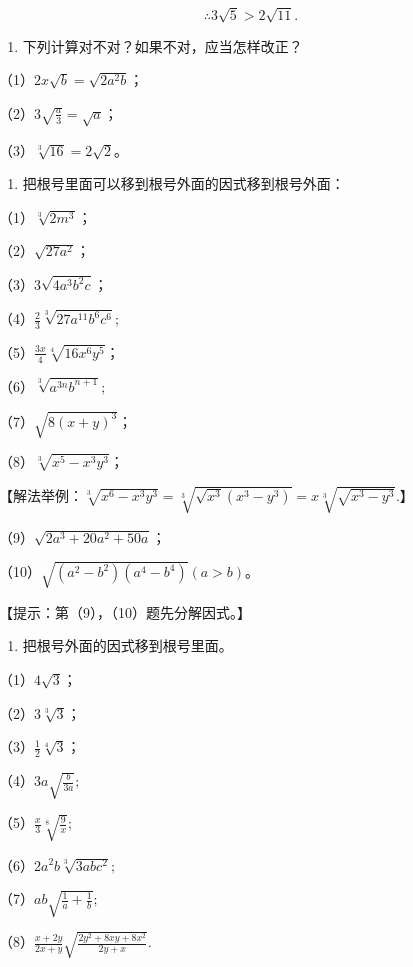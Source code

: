 \[
\therefore 3 \sqrt {5} > 2 \sqrt {11}.
\]

\begin{enumerate}
\item
  下列计算对不对？如果不对，应当怎样改正？
\end{enumerate}

（1）\(2x\sqrt{b} = \sqrt{2a^2b}\)；

（2）\(3\sqrt{\frac{a}{3}} = \sqrt{a}\)；

（3）\(\sqrt[3]{16} = 2\sqrt{2}\)。

\begin{enumerate}[start=2]
\item
  把根号里面可以移到根号外面的因式移到根号外面：
\end{enumerate}

（1）\(\sqrt[3]{2m^3}\)；

（2）\(\sqrt{27a^2}\)；

（3）\(3\sqrt{4a^3b^2c}\)；

（4）\(\frac{2}{3}\sqrt[3]{27a^{11}b^{6}c^{6}};\)

（5）\(\frac{3x}{4}\sqrt[4]{16x^6y^5}\)；

（6）\(\sqrt[3]{a^{3n}b^{n+1}};\)

（7）\(\sqrt{8(x + y)^3}\)；

（8）\(\sqrt[3]{x^5 - x^3y^3}\)；

【解法举例：\(\sqrt[3]{x^6 - x^3y^3} = \sqrt[3]{\sqrt{x^3}(x^3 - y^3)} = x\sqrt[3]{\sqrt{x^3 - y^3}}.\)】

（9）\(\sqrt{2a^3 + 20a^2 + 50a}\)；

（10）\(\sqrt{(a^2 - b^2)(a^4 - b^4)} (a > b)\)。

【提示：第（9），（10）题先分解因式。】

\begin{enumerate}[start=3]
\item
  把根号外面的因式移到根号里面。
\end{enumerate}

（1）\(4\sqrt{3}\)；

（2）\(3\sqrt[3]{3}\)；

（3）\(\frac{1}{2}\sqrt[4]{3}\)；

（4）\(3a \sqrt{\frac{b}{3a}};\)

（5）\(\frac{x}{3}\sqrt[8]{\frac{9}{x}};\)

（6）\(2a^{2}b\sqrt[3]{3abc^{2}};\)

（7）\(ab\sqrt{\frac{1}{a} + \frac{1}{b}};\)

（8）\(\frac{x + 2y}{2x + y}\sqrt{\frac{2y^2 + 8xy + 8x^2}{2y + x}}.\)

